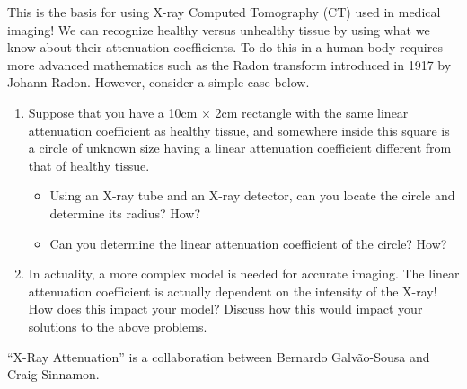 \vfill

This is the basis for using X-ray Computed Tomography (CT) used in medical imaging! We can recognize healthy versus unhealthy tissue by using what we know about their attenuation coefficients. To do this in a human body requires more advanced mathematics such as the Radon transform introduced in 1917 by Johann Radon. However, consider a simple case below.

\vfill

\begin{enumerate}[resume,label=\emph{\arabic*.}]
\item Suppose that you have a 10cm $\times$ 2cm rectangle with the same linear attenuation coefficient as healthy tissue, and somewhere inside this square is a circle of unknown size having a linear attenuation coefficient different from that of healthy tissue.
\begin{itemize}
\item  Using an X-ray tube and an X-ray detector, can you locate the circle and determine its radius? How?
\item  Can you determine the linear attenuation coefficient of the circle? How?
 \end{itemize}

 \vfill
 
 \item In actuality, a more complex model is needed for accurate imaging. The linear attenuation coefficient is actually dependent on the intensity of the X-ray! How does this impact your model? Discuss how this would impact your solutions to the above problems.

\end{enumerate}

\hfill ``X-Ray Attenuation'' is a collaboration between Bernardo Galv\~ao-Sousa and Craig Sinnamon.
\begin{noexercises}
\end{noexercises}